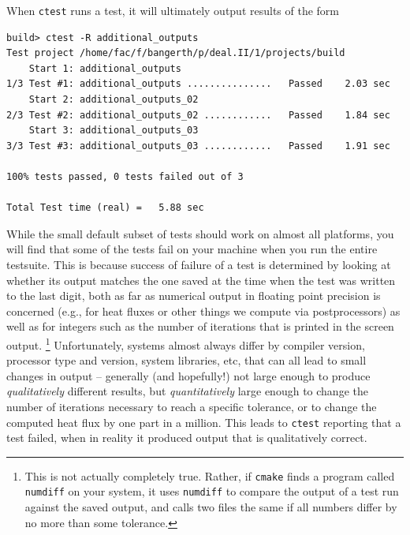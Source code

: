 \documentclass{article}
\begin{document}
When \texttt{ctest} runs a test, it will ultimately output results of the form
\begin{lstlisting}[frame=single,language=ksh]
build> ctest -R additional_outputs
Test project /home/fac/f/bangerth/p/deal.II/1/projects/build
    Start 1: additional_outputs
1/3 Test #1: additional_outputs ...............   Passed    2.03 sec
    Start 2: additional_outputs_02
2/3 Test #2: additional_outputs_02 ............   Passed    1.84 sec
    Start 3: additional_outputs_03
3/3 Test #3: additional_outputs_03 ............   Passed    1.91 sec

100% tests passed, 0 tests failed out of 3

Total Test time (real) =   5.88 sec
\end{lstlisting}
While the small default subset of tests should work on almost all platforms, you
will find that some of the tests fail on your machine when you run the entire
testsuite. This is because success of failure of a test is determined by looking
at whether its output matches the one saved at the time when the test was
written to the last digit, both as far as numerical output in floating point
precision is concerned (e.g., for heat fluxes or other things we compute via
postprocessors) as well as for integers such as the number of iterations that
is printed in the screen output.%
\footnote{This is not actually completely true. Rather, if \texttt{cmake} finds
a program called \texttt{numdiff} on your system, it uses \texttt{numdiff} to compare the
output of a test run against the saved output, and calls two files the same if
all numbers differ by no more than some tolerance.}
Unfortunately, systems almost always differ by compiler version, processor type
and version, system libraries, etc, that can all lead to small changes in output
-- generally (and hopefully!) not large enough to produce \textit{qualitatively}
different results, but \textit{quantitatively} large enough to change the number
of iterations necessary to reach a specific tolerance, or to change the computed
heat flux by one part in a million. This leads to \texttt{ctest} reporting that
a test failed, when in reality it produced output that is qualitatively correct.
\end{document}
